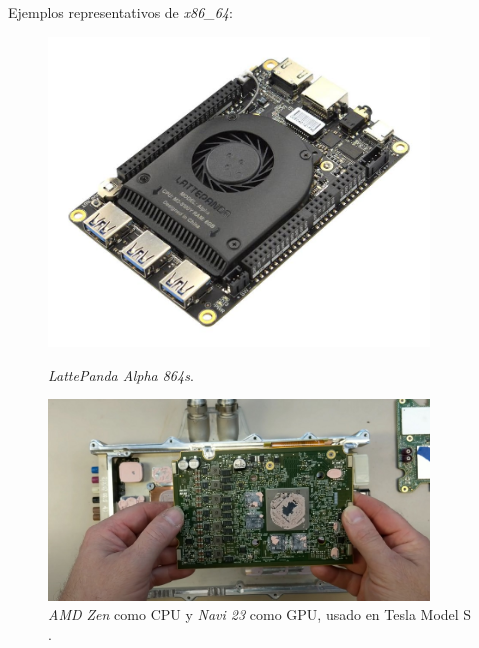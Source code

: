 Ejemplos representativos de \textit{x86\_64}:\\
\begin{figure} [h!]
	\begin{center}
		\begin{minipage}{0.45\textwidth}
			\begin{center}
				\includegraphics[width=0.9\textwidth]{figs/lattepanda}
			\end{center}
			\caption{\textit{LattePanda Alpha 864s}.}
		\end{minipage}\hfill
		\begin{minipage}{0.45\textwidth}
			\begin{center}
				\includegraphics[width=0.9\textwidth]{figs/teslazenrdna2}
			\end{center}
			\caption{\textit{AMD Zen} como CPU y \textit{Navi 23} como GPU, usado en Tesla Model S \cite{teslazenrdna2}.}
		\end{minipage}
	\end{center}
	\label{fig:x86}
\end{figure}\


